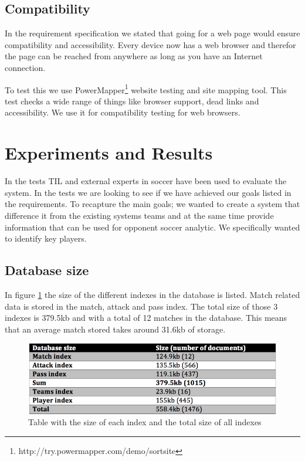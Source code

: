 \subsection{Compatibility}

In the requirement specification we stated that going for a web page would ensure compatibility and accessibility. Every device now has a web browser and therefor the page can be reached from anywhere as long as you have an Internet connection. 

To test this we use PowerMapper\footnote{ http://try.powermapper.com/demo/sortsite } website testing and site mapping tool. This test checks a wide range of things like browser support, dead links and accessibility. We use it for compatibility testing for web browsers.

\section{Experiments and Results}

In the tests \ac{TIL} and external experts in soccer have been used to evaluate the system. In the tests we are looking to see if we have achieved our goals listed in the requirements. To recapture the main goals; we wanted to create a system that difference it from the existing systems teams and at the same time provide information that can be used for opponent soccer analytic. We specifically wanted to identify key players.

\subsection{Database size}
In figure \ref{fig:dbsize} the size of the different indexes in the database is listed. Match related data is stored in the match, attack and pass index. The total size of those 3 indexes is 379.5kb and with a total of 12 matches in the database. This means that an average match stored takes around 31.6kb of storage.

\begin{figure}[ht!]
\centering
\includegraphics[width=1\textwidth]{images/evaluation/dbsize}
\caption{Table with the size of each index and the total size of all indexes}
\label{fig:dbsize}
\end{figure}

